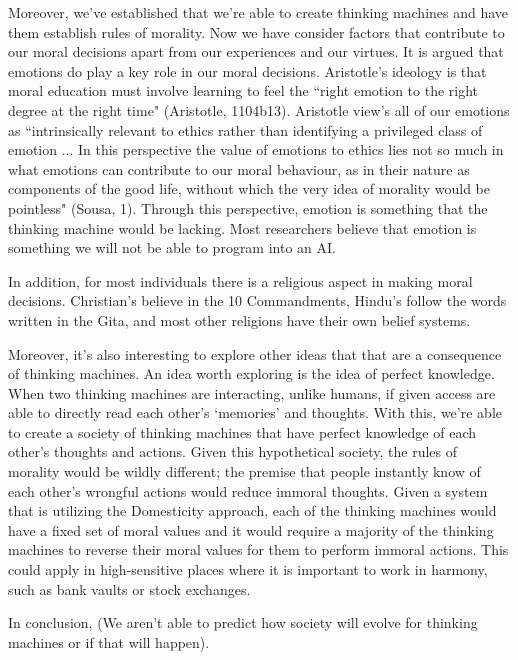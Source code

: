 \documentclass[11pt, oneside]{article}
\begin{document}
\par Moreover, we've established that we're able to create thinking machines and have them establish rules of morality. Now we have consider factors that contribute to our moral decisions apart from our experiences and our virtues. It is argued that emotions do play a key role in our moral decisions. Aristotle's ideology is that moral education must involve learning to feel the ``right emotion to the right degree at the right time" (Aristotle, 1104b13). Aristotle view's all of our emotions as ``intrinsically relevant to ethics rather than identifying a privileged class of emotion ... In this perspective the value of emotions to ethics lies not so much in what emotions can contribute to our moral behaviour, as in their nature as components of the good life, without which the very idea of morality would be pointless" (Sousa, 1). Through this perspective, emotion is something that the thinking machine would be lacking. Most researchers believe that emotion is something we will not be able to program into an AI. 

\par In addition, for most individuals there is a religious aspect in making moral decisions. Christian's believe in the 10 Commandments, Hindu's follow the words written in the Gita, and most other religions have their own belief systems. 

\par 
Moreover, it's also interesting to explore other ideas that that are a consequence of thinking machines. 
An idea worth exploring is the idea of perfect knowledge. When two thinking machines are interacting, unlike humans, if given access are able to directly read each other's `memories' and thoughts. With this, we're able to create a society of thinking machines that have perfect knowledge of each other's thoughts and actions. 
Given this hypothetical society, the rules of morality would be wildly different; the premise that people instantly know of each other's wrongful actions would reduce immoral thoughts. Given a system that is utilizing the Domesticity approach, each of the thinking machines would have a fixed set of moral values and it would require a majority of the thinking machines to reverse their moral values for them to perform immoral actions. 
This could apply in high-sensitive places where it is important to work in harmony, such as bank vaults or stock exchanges. 

\par In conclusion, (We aren't able to predict how society will evolve for thinking machines or if that will happen).
\end{document}
